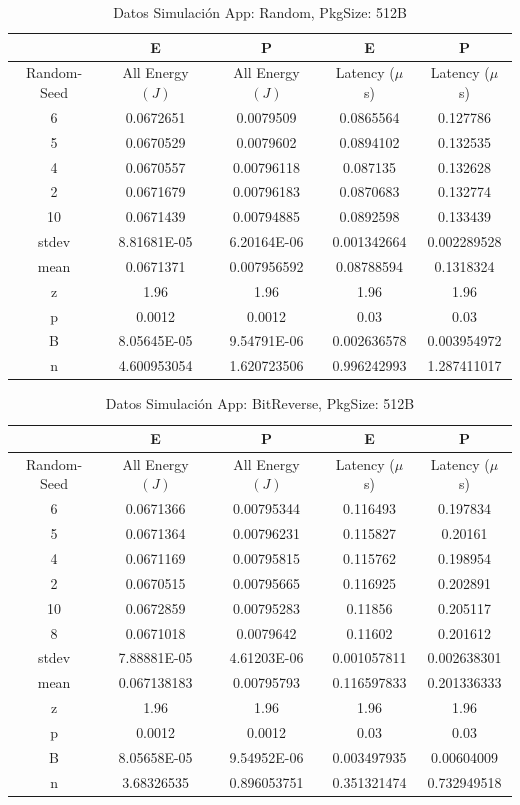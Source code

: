 \begin{table}[H]
\centering
\begin{tabular}{|c|c|c|c|c|}
\hline
 &E&P&E&P\\
\hline
Random-Seed&All Energy $(J)$&All Energy $(J)$&Latency ($\mu$ s)&Latency ($\mu$ s)\\
\hline
6&0.0672651&0.0079509&0.0865564&0.127786\\
5&0.0670529&0.0079602&0.0894102&0.132535\\
4&0.0670557&0.00796118&0.087135&0.132628\\
2&0.0671679&0.00796183&0.0870683&0.132774\\
10&0.0671439&0.00794885&0.0892598&0.133439\\
\hline
stdev&8.81681E-05&6.20164E-06&0.001342664&0.002289528\\
mean&0.0671371&0.007956592&0.08788594&0.1318324\\
z&1.96&1.96&1.96&1.96\\
p&0.0012&0.0012&0.03&0.03\\
B&8.05645E-05&9.54791E-06&0.002636578&0.003954972\\
\hline
n&4.600953054&1.620723506&0.996242993&1.287411017\\
\hline
\end{tabular}
\caption{Datos Simulación App: Random, PkgSize: 512B}
\label{tb:sr512}
\end{table}

\begin{table}[H]
\centering
\begin{tabular}{|c|c|c|c|c|}
\hline
 &E&P&E&P\\
\hline
Random-Seed&All Energy $(J)$&All Energy $(J)$&Latency ($\mu$ s)&Latency ($\mu$ s)\\
\hline
6&0.0671366&0.00795344&0.116493&0.197834\\
5&0.0671364&0.00796231&0.115827&0.20161\\
4&0.0671169&0.00795815&0.115762&0.198954\\
2&0.0670515&0.00795665&0.116925&0.202891\\
10&0.0672859&0.00795283&0.11856&0.205117\\
8&0.0671018&0.0079642&0.11602&0.201612\\
\hline
stdev&7.88881E-05&4.61203E-06&0.001057811&0.002638301\\
mean&0.067138183&0.00795793&0.116597833&0.201336333\\
z&1.96&1.96&1.96&1.96\\
p&0.0012&0.0012&0.03&0.03\\
B&8.05658E-05&9.54952E-06&0.003497935&0.00604009\\
\hline
n&3.68326535&0.896053751&0.351321474&0.732949518\\
\hline
\end{tabular}
\caption{Datos Simulación App: BitReverse, PkgSize: 512B}
\label{tb:sb512}
\end{table}

